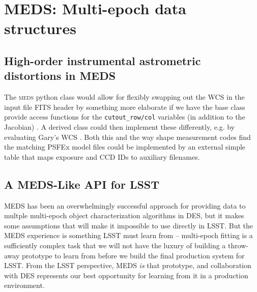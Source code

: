 \documentclass[\docopts]{\docclass}
\begin{document}

\section{MEDS: Multi-epoch data structures}


\subsection{High-order instrumental astrometric distortions in MEDS}


The \textsc{meds} python class would allow for flexibly swapping out the WCS in the input file FITS header by something more elaborate if we have the base class provide access functions for the \texttt{cutout\_row/col} variables (in addition to the Jacobian) . A derived class could then implement these differently, e.g. by evaluating Gary's WCS . Both this and the way shape measurement codes find the matching PSFEx model files could be implemented by an external simple table that maps exposure and CCD IDs to auxiliary filenames.


\subsection{A MEDS-Like API for LSST}

MEDS has been an overwhelmingly successful approach for providing data to multple multi-epoch object characterization algorithms in DES, but it makes some assumptions that will make it impossible to use directly in LSST.  But the MEDS experience is something LSST must learn from -- multi-epoch fitting is a sufficiently complex task that we will not have the luxury of building a throw-away prototype to learn from before we build the final production system for LSST.  From the LSST perspective, MEDS \emph{is} that prototype, and collaboration with DES represents our best opportunity for learning from it in a production environment.
\end{document}
